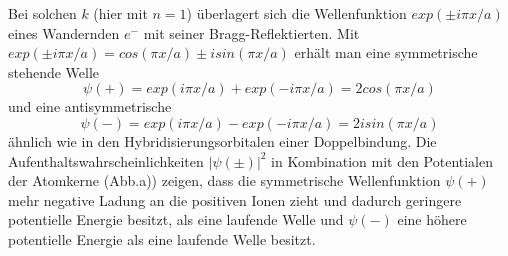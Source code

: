 Bei solchen $k$ (hier mit $n=1$) überlagert sich die Wellenfunktion $exp(\pm i \pi x / a)$ eines Wandernden $e^-$ mit seiner Bragg-Reflektierten.
Mit $exp(\pm i \pi x / a) = cos(\pi x/a) \pm i sin(\pi x/a)$ erhält man eine symmetrische stehende Welle
\begin{equation}
    \psi(+) = exp( i \pi x / a) + exp(- i \pi x / a) = 2cos(\pi x/a)
\end{equation}
und eine antisymmetrische
\begin{equation}
    \psi(-) = exp( i \pi x / a) - exp(- i \pi x / a) = 2 i sin(\pi x/a)
\end{equation}
ähnlich wie in den Hybridisierungsorbitalen einer Doppelbindung.
Die Aufenthaltswahrscheinlichkeiten $\left|\psi(\pm)\right|^2$ in Kombination mit den Potentialen der Atomkerne (Abb.a)) zeigen, dass die symmetrische Wellenfunktion $\psi(+)$ mehr negative Ladung an die positiven Ionen zieht und dadurch geringere potentielle Energie besitzt, als eine laufende Welle und $\psi(-)$ eine höhere potentielle Energie als eine laufende Welle besitzt.
